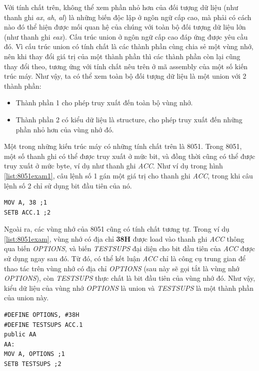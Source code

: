 Với tính chất trên, không thể xem phần nhỏ hơn của đối tượng dữ liệu (như thanh ghi \textit{ax}, \textit{ah}, \textit{al}) là những biến độc lập ở ngôn ngữ cấp cao, mà phải có cách nào đó thể hiện được mối quan hệ của chúng với toàn bộ đối tượng dữ liệu lớn (như thanh ghi \textit{eax}). Cấu trúc union ở ngôn ngữ cấp cao đáp ứng được yêu cầu đó. Vì cấu trúc union có tính chất là các thành phần cùng chia sẻ một vùng nhớ, nên khi thay đổi giá trị của một thành phần thì các thành phần còn lại cũng thay đổi theo, tương ứng với tính chất nêu trên ở mã assembly của một số kiến trúc máy. Như vậy, ta có thể xem toàn bộ đối tượng dữ liệu là một union với 2 thành phần:
\begin{itemize}
	\item Thành phần 1 cho phép truy xuất đến toàn bộ vùng nhớ.
	\item Thành phần 2 có kiểu dữ liệu là structure, cho phép truy xuất đến những phần nhỏ hơn của vùng nhớ đó.
\end{itemize}

Một trong những kiến trúc máy có những tính chất trên là 8051. Trong 8051, một số thanh ghi có thể được truy xuất ở mức bit, và đồng thời cũng có thể được truy xuất ở mức byte, ví dụ như thanh ghi \textit{ACC}. Như ví dụ trong hình \ref{list:8051exam1}, câu lệnh số 1 gán một giá trị cho thanh ghi \textit{ACC}, trong khi câu lệnh số 2 chỉ sử dụng bit đầu tiên của nó.

\begin{lstlisting}[caption={Đoạn mã 8051 sử dụng thanh ghi ACC ở nhiều cấp độ},label={list:8051exam1}]
MOV A, 38 ;1
SETB ACC.1 ;2
\end{lstlisting}

Ngoài ra, các vùng nhớ của 8051 cũng có tính chất tương tự. Trong ví dụ \ref{list:8051exam}, vùng nhớ có địa chỉ \textbf{38H} được load vào thanh ghi \textit{ACC} thông qua biến \textit{OPTIONS}, và biến \textit{TESTSUPS} đại diện cho bit đầu tiên của \textit{ACC} được sử dụng ngay sau đó. Từ đó, có thể kết luận \textit{ACC} chỉ là công cụ trung gian để thao tác trên vùng nhớ có địa chỉ \textit{OPTIONS} (sau này sẽ gọi tắt là vùng nhớ \textit{OPTIONS}), còn \textit{TESTSUPS} thực chất là bit đầu tiên của vùng nhớ đó. Như vậy, kiểu dữ liệu của vùng nhớ \textit{OPTIONS} là union và \textit{TESTSUPS} là một thành phần của union này.
\begin{lstlisting}[caption={Đoạn mã 8051 có một vùng nhớ mang kiểu union},label={list:8051exam}]
#DEFINE OPTIONS, #38H
#DEFINE TESTSUPS ACC.1
public AA
AA:
MOV A, OPTIONS ;1
SETB TESTSUPS ;2
\end{lstlisting}

